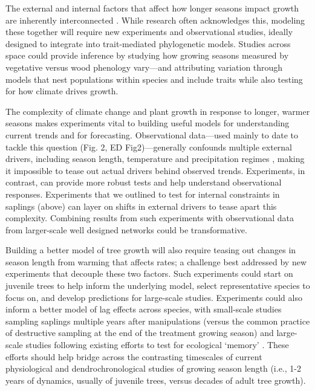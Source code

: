 \documentclass[11pt]{article}
\begin{document}
The external and internal factors that affect how longer seasons impact growth are inherently interconnected \citep{nobel1983biophysical}. While research often acknowledges this, modeling these together will require new experiments and observational studies, ideally designed to integrate into trait-mediated phylogenetic models. Studies across space could provide inference by studying how growing seasons measured by vegetative versus wood phenology vary---and attributing variation through models that nest populations within species and include traits while also testing for how climate drives growth.  


The complexity of climate change and plant growth in response to longer, warmer seasons makes experiments vital to building useful models for understanding current trends and for forecasting. Observational data---used mainly to date to tackle this question (Fig. 2, ED Fig2)---generally confounds multiple external drivers, including season length, temperature and precipitation regimes \citep{ren2019,ipcc2021,camarero2022decoupled}, making it impossible to tease out actual drivers behind observed trends. Experiments, in contrast, can provide more robust tests and help understand observational responses. Experiments that we outlined to test for internal constraints in saplings (above) can layer on shifts in external drivers to tease apart this complexity. Combining results from such experiments with observational data from larger-scale well designed networks \citep[see][]{schuldt2020first} could be transformative. 

Building a better model of tree growth will also require teasing out changes in season length from warming that affects rates; a challenge best addressed by new experiments that decouple these two factors. Such experiments could start on juvenile trees to help inform the underlying model, select representative species to focus on, and  develop predictions for large-scale studies. Experiments could also inform a better model of lag effects across species, with small-scale studies sampling saplings multiple years after manipulations (versus the common practice of destructive sampling at the end of the treatment growing season) and large-scale studies following existing efforts to test for ecological `memory'  \citep[e.g. ][]{flinker2021promise,schweiger2022transgenerational,chinmemory}. These efforts should help bridge across the contrasting timescales of current physiological and dendrochronological studies of growing season length (i.e., 1-2 years of dynamics, usually of juvenile trees, versus decades of adult tree growth).
\end{document}
